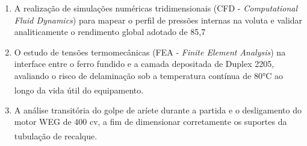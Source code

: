 \begin{enumerate}
    \item A realização de simulações numéricas tridimensionais (CFD - \textit{Computational Fluid Dynamics}) para mapear o perfil de pressões internas na voluta e validar analiticamente o rendimento global adotado de 85,7%





    \item O estudo de tensões termomecânicas (FEA - \textit{Finite Element Analysis}) na interface entre o ferro fundido e a camada depositada de Duplex 2205, avaliando o risco de delaminação sob a temperatura contínua de 80°C ao longo da vida útil do equipamento\textsuperscript{}.





    \item A análise transitória do golpe de aríete durante a partida e o desligamento do motor WEG de 400 cv, a fim de dimensionar corretamente os suportes da tubulação de recalque\textsuperscript{}.


\end{enumerate}
